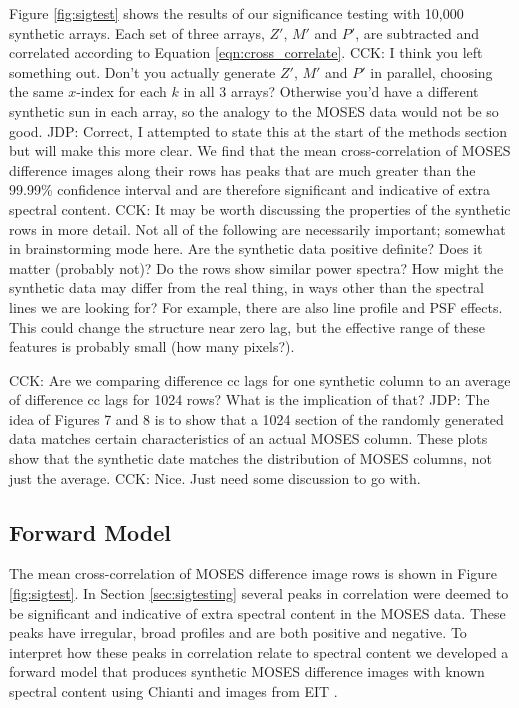 \documentclass[]{solarphysics}
\newcommand{\cck}[1]{{\color{red} CCK: #1}} %
\newcommand{\jdp}[1]{{\color{blue} JDP: #1}} %
\begin{document}
\begin{article}
	Figure \ref{fig:sigtest} shows the results of our significance testing with 10,000 synthetic arrays.  Each set of three arrays, $Z'$, $M'$ and $P'$, are subtracted and correlated according to Equation \ref{eqn:cross_correlate}. \cck{I think you left something out. Don't you actually generate $Z'$, $M'$ and $P'$ in parallel, choosing the same $x$-index for each $k$ in all 3 arrays? Otherwise you'd have a different synthetic sun in each array, so the analogy to the MOSES data would not be so good.} \jdp{Correct, I attempted to state this at the start of the methods section but will make this more clear.} We find that the mean cross-correlation of MOSES difference images along their rows has peaks that are much greater than the 99.99\% confidence interval and are therefore significant and indicative of extra spectral content. \cck{It may be worth discussing the properties of the synthetic rows in more detail. Not all of the following are necessarily important; somewhat in brainstorming mode here. Are the synthetic data positive definite? Does it matter (probably not)? Do the rows show similar power spectra? How might the synthetic data may differ from the real thing, in ways other than the spectral lines we are looking for? For example, there are also line profile and PSF effects. This could change the structure near zero lag, but the effective range of these features is probably small (how many pixels?). } 
	
    \cck{Are we comparing difference cc lags for one synthetic column to an average of difference cc lags for 1024 rows? What is the implication of that?} \jdp{The idea of Figures 7 and 8 is to show that a 1024 section of the randomly generated data matches certain characteristics of an actual MOSES column.  These plots show that the synthetic date matches the distribution of MOSES columns, not just the average.} \cck{Nice. Just need some discussion to go with.}
	
	
	
	
	\subsection{Forward Model} 
	The mean cross-correlation of MOSES difference image rows is shown in Figure \ref{fig:sigtest}.  In Section \ref{sec:sigtesting} several peaks in correlation were deemed to be significant and indicative of extra spectral content in the MOSES  data.  These peaks have irregular, broad profiles and are both positive and negative.  To interpret how these peaks in correlation relate to spectral content we developed a forward model that produces synthetic MOSES difference images with known spectral content using Chianti \citep{} and images from EIT \citep{}.  
	


\end{article}
\end{document}
